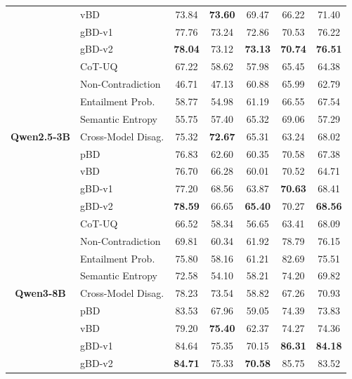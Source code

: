 \documentclass[twoside]{article}
\begin{document}
\begin{table}[t]
\begin{tabular}{c l cc ccc}
      & vBD                     & 73.84 & \textbf{73.60} & 69.47 & 66.22 & 71.40 \\
      & gBD-v1                  & 77.76 & 73.24 & 72.86 & 70.53 & 76.22 \\
      & gBD-v2                  & \textbf{78.04} & 73.12 & \textbf{73.13} & \textbf{70.74} & \textbf{76.51} \\
    \midrule
    \multirow{9}{*}{\textbf{Qwen2.5-3B}}
      & CoT-UQ                  & 67.22 & 58.62 & 57.98 & 65.45 & 64.38 \\
      & Non-Contradiction       & 46.71 & 47.13 & 60.88 & 65.99 & 62.79 \\
      & Entailment Prob.        & 58.77 & 54.98 & 61.19 & 66.55 & 67.54 \\
      & Semantic Entropy        & 55.75 & 57.40 & 65.32 & 69.06 & 57.29 \\
      & Cross-Model Disag.      & 75.32 & \textbf{72.67} & 65.31 & 63.24 & 68.02 \\
    \cmidrule(lr){2-7}
      & pBD                     & 76.83 & 62.60 & 60.35 & 70.58 & 67.38 \\
      & vBD                     & 76.70 & 66.28 & 60.01 & 70.52 & 64.71 \\
      & gBD-v1                  & 77.20 & 68.56 & 63.87 & \textbf{70.63} & 68.41 \\
      & gBD-v2                  & \textbf{78.59} & 66.65 & \textbf{65.40} & 70.27 & \textbf{68.56} \\
    \midrule
    \multirow{9}{*}{\textbf{Qwen3-8B}}
      & CoT-UQ      & 66.52 & 58.34 & 56.65 & 63.41 & 68.09 \\
      & Non-Contradiction       & 69.81 & 60.34 & 61.92 & 78.79 & 76.15 \\
      & Entailment Prob.        & 75.80 & 58.16 & 61.21 & 82.69 & 75.51 \\
      & Semantic Entropy        & 72.58 & 54.10 & 58.21 & 74.20 & 69.82 \\
      & Cross-Model Disag.      & 78.23 & 73.54 & 58.82 & 67.26 & 70.93 \\
    \cmidrule(lr){2-7}
      & pBD                     & 83.53 & 67.96 & 59.05 & 74.39 & 73.83 \\
      & vBD                     & 79.20 & \textbf{75.40} & 62.37 & 74.27 & 74.36 \\
      & gBD-v1                  & 84.64 & 75.35 & 70.15 & \textbf{86.31} & \textbf{84.18} \\
      & gBD-v2                  & \textbf{84.71} & 75.33 & \textbf{70.58} & 85.75 & 83.52 \\
    \bottomrule
  \end{tabular}
\end{table}
\end{document}
